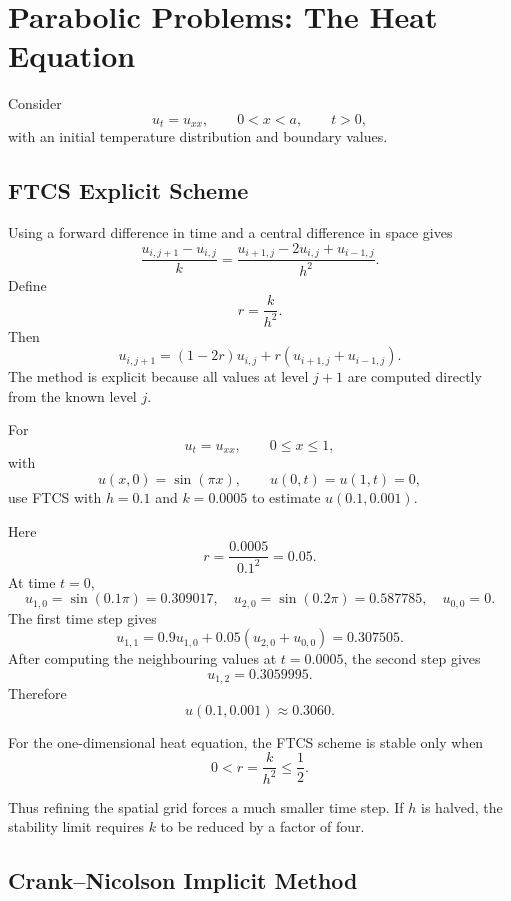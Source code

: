 \section{Parabolic Problems: The Heat Equation}

Consider
\[
 u_t=u_{xx},
 \qquad0<x<a,
 \qquad t>0,
\]
with an initial temperature distribution and boundary values.

\subsection{FTCS Explicit Scheme}

Using a forward difference in time and a central difference in space gives
\[
 \frac{u_{i,j+1}-u_{i,j}}k
 =\frac{u_{i+1,j}-2u_{i,j}+u_{i-1,j}}{h^2}.
\]
Define
\[
 r=\frac{k}{h^2}.
\]
Then
\[
 \boxed{
 u_{i,j+1}
 =(1-2r)u_{i,j}
 +r(u_{i+1,j}+u_{i-1,j})
 }.
\]
The method is explicit because all values at level $j+1$ are computed directly from the known level $j$.

\begin{example}
For
\[
 u_t=u_{xx},
 \qquad0\le x\le1,
\]
with
\[
 u(x,0)=\sin(\pi x),
 \qquad
 u(0,t)=u(1,t)=0,
\]
use FTCS with $h=0.1$ and $k=0.0005$ to estimate $u(0.1,0.001)$.
\end{example}

\begin{solution}[5.0cm]
Here
\[
 r=\frac{0.0005}{0.1^2}=0.05.
\]
At time $t=0$,
\[
 u_{1,0}=\sin(0.1\pi)=0.309017,
 \quad
 u_{2,0}=\sin(0.2\pi)=0.587785,
 \quad u_{0,0}=0.
\]
The first time step gives
\[
 u_{1,1}=0.9u_{1,0}+0.05(u_{2,0}+u_{0,0})
 =0.307505.
\]
After computing the neighbouring values at $t=0.0005$, the second step gives
\[
 u_{1,2}=0.3059995.
\]
Therefore
\[
 u(0.1,0.001)\approx0.3060.
\]
\end{solution}

\begin{theorem}
For the one-dimensional heat equation, the FTCS scheme is stable only when
\[
 0<r=\frac{k}{h^2}\le\frac12.
\]
\end{theorem}

Thus refining the spatial grid forces a much smaller time step.  If $h$ is halved, the stability limit requires $k$ to be reduced by a factor of four.

\subsection{Crank--Nicolson Implicit Method}

